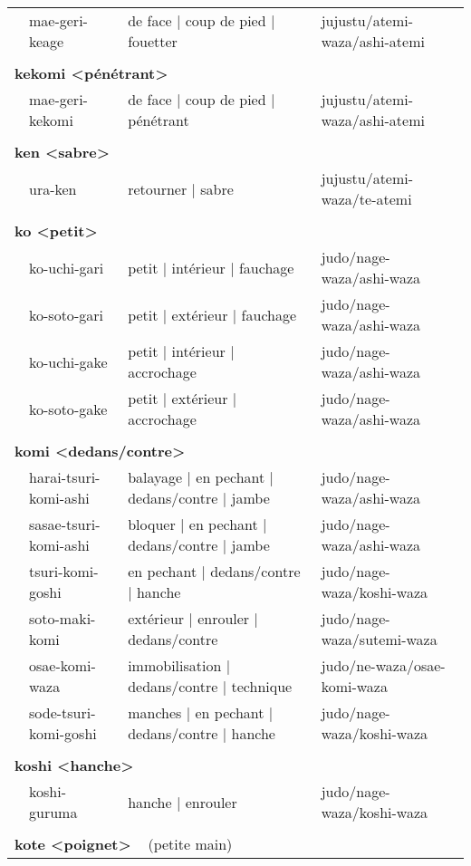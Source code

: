 \documentclass{article}%
\begin{document}
\begin{longtable}{rlll}
&mae{-}geri{-}keage&de face | coup de pied | fouetter&jujustu/atemi{-}waza/ashi{-}atemi\\%
&&&\\%
\multicolumn{3}{l}{\textbf{kekomi <pénétrant>}%
~%
}&\\%
&mae{-}geri{-}kekomi&de face | coup de pied | pénétrant&jujustu/atemi{-}waza/ashi{-}atemi\\%
&&&\\%
\multicolumn{3}{l}{\textbf{ken <sabre>}%
~%
}&\\%
&ura{-}ken&retourner | sabre&jujustu/atemi{-}waza/te{-}atemi\\%
&&&\\%
\multicolumn{3}{l}{\textbf{ko <petit>}%
~%
}&\\%
&ko{-}uchi{-}gari&petit | intérieur | fauchage&judo/nage{-}waza/ashi{-}waza\\%
&ko{-}soto{-}gari&petit | extérieur | fauchage&judo/nage{-}waza/ashi{-}waza\\%
&ko{-}uchi{-}gake&petit | intérieur | accrochage&judo/nage{-}waza/ashi{-}waza\\%
&ko{-}soto{-}gake&petit | extérieur | accrochage&judo/nage{-}waza/ashi{-}waza\\%
&&&\\%
\multicolumn{3}{l}{\textbf{komi <dedans/contre>}%
~%
}&\\%
&harai{-}tsuri{-}komi{-}ashi&balayage | en pechant | dedans/contre | jambe&judo/nage{-}waza/ashi{-}waza\\%
&sasae{-}tsuri{-}komi{-}ashi&bloquer | en pechant | dedans/contre | jambe&judo/nage{-}waza/ashi{-}waza\\%
&tsuri{-}komi{-}goshi&en pechant | dedans/contre | hanche&judo/nage{-}waza/koshi{-}waza\\%
&soto{-}maki{-}komi&extérieur | enrouler | dedans/contre&judo/nage{-}waza/sutemi{-}waza\\%
&osae{-}komi{-}waza&immobilisation | dedans/contre | technique&judo/ne{-}waza/osae{-}komi{-}waza\\%
&sode{-}tsuri{-}komi{-}goshi&manches | en pechant | dedans/contre | hanche&judo/nage{-}waza/koshi{-}waza\\%
&&&\\%
\multicolumn{3}{l}{\textbf{koshi <hanche>}%
~%
}&\\%
&koshi{-}guruma&hanche | enrouler&judo/nage{-}waza/koshi{-}waza\\%
&&&\\%
\multicolumn{3}{l}{\textbf{kote <poignet>}%
~%
(petite main)}&\\%

\end{longtable}
\end{document}
